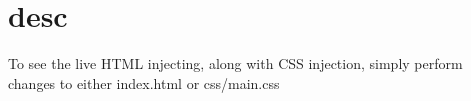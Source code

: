 \chapter{desc}
\hypertarget{md__d_1_2_g_i_t_2_food_link_2foodlink_8client_2node__modules_2bs-recipes_2recipes_2html_8injection_2desc}{}\label{md__d_1_2_g_i_t_2_food_link_2foodlink_8client_2node__modules_2bs-recipes_2recipes_2html_8injection_2desc}
To see the live HTML injecting, along with CSS injection, simply perform changes to either {\ttfamily index.\+html} or {\ttfamily css/main.\+css} 